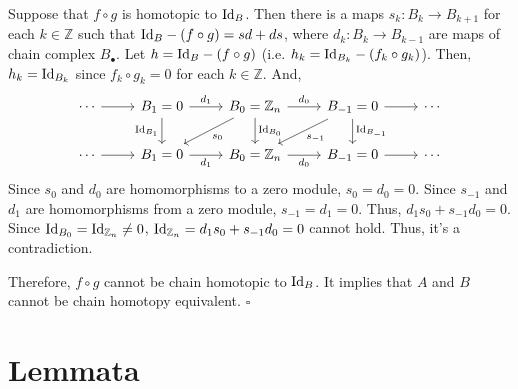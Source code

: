 \documentclass{article}
\newcommand{\qedsq}{\hfill$\square$}
\newcommand{\bbZ}{\mathbb{Z}}
\newcommand{\Id}{\textnormal{Id}}
\begin{document}
Suppose that \(f \circ g\) is homotopic to \(\Id_B\).
Then there is a maps \(s_k: B_k \to B_{k + 1}\) for each \(k \in \bbZ\) such that \(\Id_B - (f \circ g) = sd + ds\), where \(d_k: B_k \to B_{k - 1}\) are maps of chain complex \(B_\bullet\).
Let \(h = \Id_B - (f \circ g)\) (i.e. \(h_k = \Id_{B_k} - (f_k \circ g_k)\)). Then, \(h_k = \Id_{B_k}\) since \(f_k \circ g_k = 0\) for each \(k \in \bbZ\). And,
\[\begin{tikzcd}
  \cdots \ar{r} &
  B_{1} = 0 \ar["d_1"]{r} \ar[swap, "\Id_{B_{1}}"]{d} &
  B_{0} = \bbZ_n \ar["d_0"]{r} \ar["s_0"]{ld} \ar["\Id_{B_0}"]{d} &
  B_{-1} = 0 \ar{r} \ar["s_{-1}"]{ld} \ar["\Id_{B_{-1}}"]{d} &
  \cdots \\
  \cdots \ar{r} &
  B_{1} = 0 \ar[swap, "d_1"]{r} &
  B_{0} = \bbZ_n \ar[swap, "d_0"]{r} &
  B_{-1} = 0 \ar{r} &
  \cdots
\end{tikzcd}\]
Since \(s_0\) and \(d_0\) are homomorphisms to a zero module, \(s_0 = d_0 = 0\).
Since \(s_{-1}\) and \(d_1\) are homomorphisms from a zero module, \(s_{-1} = d_1 = 0\).
Thus, \(d_1s_0 + s_{-1}d_0 = 0\).
Since \(\Id_{B_0} = \Id_{\bbZ_n} \neq 0\), \(\Id_{\bbZ_n} = d_1s_0 + s_{-1}d_0 = 0\) cannot hold.
Thus, it's a contradiction.

Therefore, \(f \circ g\) cannot be chain homotopic to \(\Id_B\).
It implies that \(A\) and \(B\) cannot be chain homotopy equivalent.
\qedsq

\newpage
\section*{Lemmata}
\end{document}
